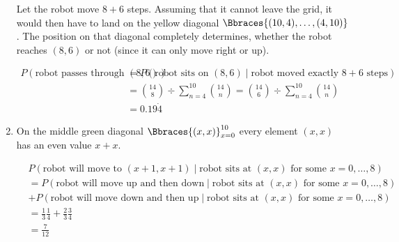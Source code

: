\begin{solution}
\begin{enumerate}[label = (\alph*)]
    Let the robot move $8 + 6$ steps.
    Assuming that it cannot leave the grid, it would then have to land on the yellow diagonal $\Bbraces{(10, 4), \dots, (4, 10)}$.
    The position on that diagonal completely determines, whether the robot reaches $(8, 6)$ or not (since it can only move right or up).
    
    \begin{align*}
        P(\text{robot passes through $(8, 6)$})
        & =
        P(\text{robot sits on $(8, 6)$} \mid \text{robot moved exactly $8 + 6$ steps}) \\
        & =
        \binom{14}{8} \div \sum_{n=4}^{10} \binom{14}{n}
        =
        \binom{14}{6} \div \sum_{n=4}^{10} \binom{14}{n} \\
        & =
        0.19 \dot 4
    \end{align*}

    \item On the middle green diagonal $\Bbraces{(x, x)}_{x=0}^{10}$ every element $(x, x)$ has an even value $x + x$.

    \begin{align*}
        &
        P(\text{robot will move to $(x+1, x+1)$} \mid \text{robot sits at $(x, x)$ for some $x = 0, \dots, 8$}) \\
        & =
        P(\text{robot will move up and then down} \mid \text{robot sits at $(x, x)$ for some $x = 0, \dots, 8$}) \\
        & +
        P(\text{robot will move down and then up} \mid \text{robot sits at $(x, x)$ for some $x = 0, \dots, 8$}) \\
        & =
        \frac{1}{3} \frac{1}{4} + \frac{2}{3} \frac{3}{4} \\
        & =
        \frac{7}{12}
    \end{align*}


\end{enumerate}
\end{solution}
